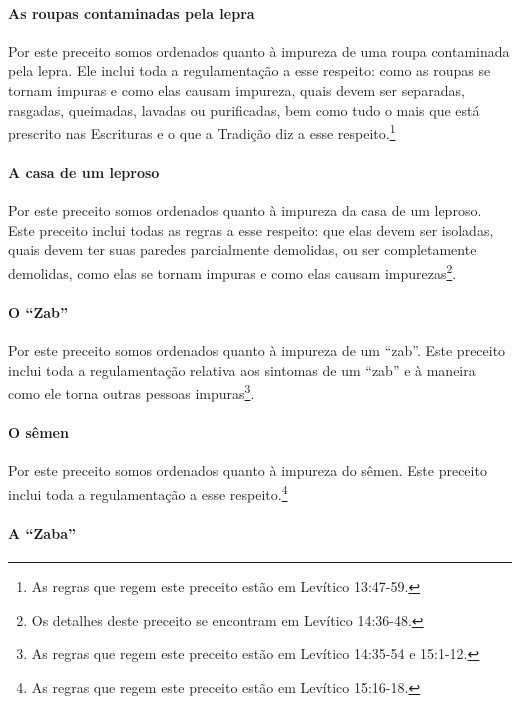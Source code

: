 \paragraph{As roupas contaminadas pela lepra}

Por este preceito somos ordenados quanto à impureza de uma roupa
contaminada pela lepra. Ele inclui toda a regulamentação a esse
respeito: como as roupas se tornam impuras e como elas causam impureza,
quais devem ser separadas, rasgadas, queimadas, lavadas ou purificadas, bem
como tudo o mais que está prescrito nas Escrituras e o que a Tradição
diz a esse respeito.\footnote{As regras que regem este preceito estão em Levítico 13:47-59.}

\paragraph{A casa de um leproso}

Por este preceito somos ordenados quanto à impureza da casa de um
leproso. Este preceito inclui todas as regras a esse respeito: que elas
devem ser isoladas, quais devem ter suas paredes parcialmente demolidas,
ou ser completamente demolidas, como elas se tornam impuras e como elas
causam impurezas\footnote{Os detalhes deste preceito se encontram em Levítico
14:36-48.}.

\paragraph{O ``Zab''}

Por este preceito somos ordenados quanto à impureza de um ``zab''.
Este preceito inclui toda a regulamentação relativa aos sintomas de um
``zab'' e à maneira como ele torna outras pessoas
impuras\footnote{As regras que regem este preceito estão em Levítico 14:35-54 e
  15:1-12.}.

\paragraph{O sêmen}

Por este preceito somos ordenados quanto à impureza do sêmen. Este
preceito inclui toda a regulamentação a esse respeito.\footnote{As regras que regem este preceito estão em Levítico 15:16-18.}

\paragraph{A ``Zaba''}

